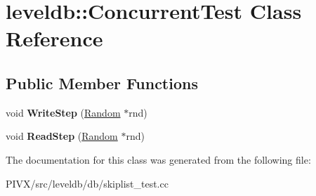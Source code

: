 \hypertarget{classleveldb_1_1_concurrent_test}{}\section{leveldb\+:\+:Concurrent\+Test Class Reference}
\label{classleveldb_1_1_concurrent_test}
\subsection*{Public Member Functions}
\begin{DoxyCompactItemize}
\item 
\mbox{\label{classleveldb_1_1_concurrent_test_a43dc8afb9124c364d6e97dc3d421131f}} 
void {\bfseries Write\+Step} (\mbox{\hyperlink{classleveldb_1_1_random}{Random}} $\ast$rnd)
\item 
\mbox{\label{classleveldb_1_1_concurrent_test_a9dcaf11ec747ad37150526f891627c50}} 
void {\bfseries Read\+Step} (\mbox{\hyperlink{classleveldb_1_1_random}{Random}} $\ast$rnd)
\end{DoxyCompactItemize}


The documentation for this class was generated from the following file\+:\begin{DoxyCompactItemize}
\item 
P\+I\+V\+X/src/leveldb/db/skiplist\+\_\+test.\+cc\end{DoxyCompactItemize}
